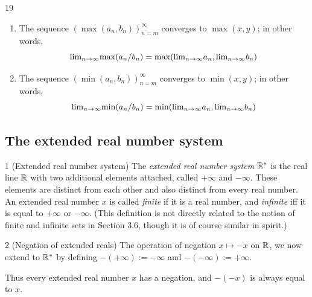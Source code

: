 \begin{theorem}{19}
\begin{enumerate}
\begin{equation*}
        \end{equation*}
        \item The sequence $(\max(a_n, b_n))_{n=m}^{\infty}$ converges to $\max(x,y)$;
        in other words,
        \begin{equation*}
            \text{lim}_{n \rightarrow \infty}{\max(a_n / b_n)} = \max(\text{lim}_{n \rightarrow \infty}{a_n}, \text{lim}_{n \rightarrow \infty}{b_n})
        \end{equation*}
        \item The sequence $(\min(a_n, b_n))_{n=m}^{\infty}$ converges to $\min(x,y)$;
        in other words,
        \begin{equation*}
            \text{lim}_{n \rightarrow \infty}{\min(a_n / b_n)} = \min(\text{lim}_{n \rightarrow \infty}{a_n}, \text{lim}_{n \rightarrow \infty}{b_n})
        \end{equation*}
    \end{enumerate}
\end{theorem}

\subsection{The extended real number system}
\begin{definition}{1}
    \label{extended-reals}
    (Extended real number system) The \emph{extended real number system} $\mathbb{R}^*$
    is the real line $\mathbb{R}$ with two additional elements attached, called
    $+\infty$ and $-\infty$. These elements are distinct from each other and also
    distinct from every real number. An extended real number $x$ is called \emph{finite}
    if it is a real number, and \emph{infinite} iff it is equal to $+\infty$ or
    $-\infty$. (This definition is not directly related to the notion of finite
    and infinite sets in Section 3.6, though it is of course similar in spirit.)
\end{definition}

\begin{definition}{2}
    \label{extended-negation}
    (Negation of extended reals) The operation of negation $x \mapsto -x$ on $\mathbb{R}$,
    we now extend to $\mathbb{R}^*$ by defining $-(+\infty) := -\infty$ and
    $-(-\infty) := +\infty$.

    Thus every extended real number $x$ has a negation, and $-(-x)$ is always equal
    to $x$.
\end{definition}

